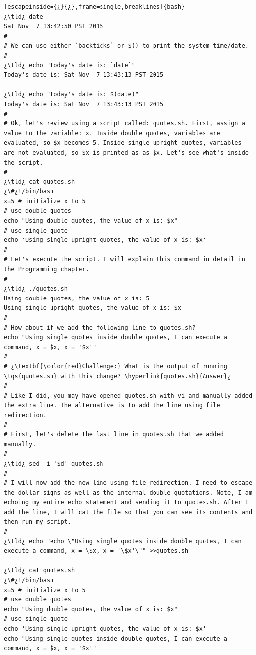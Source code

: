 \begin{lstlisting}[escapeinside={¿}{¿},frame=single,breaklines]{bash}
¿\tld¿ date
Sat Nov  7 13:42:50 PST 2015
#
# We can use either `backticks` or $() to print the system time/date.
#
¿\tld¿ echo "Today's date is: `date`"
Today's date is: Sat Nov  7 13:43:13 PST 2015

¿\tld¿ echo "Today's date is: $(date)"
Today's date is: Sat Nov  7 13:43:13 PST 2015
#
# Ok, let's review using a script called: quotes.sh. First, assign a value to the variable: x. Inside double quotes, variables are evaluated, so $x becomes 5. Inside single upright quotes, variables are not evaluated, so $x is printed as as $x. Let's see what's inside the script.
#
¿\tld¿ cat quotes.sh
¿\#¿!/bin/bash
x=5 # initialize x to 5
# use double quotes
echo "Using double quotes, the value of x is: $x"
# use single quote
echo 'Using single upright quotes, the value of x is: $x'
#
# Let's execute the script. I will explain this command in detail in the Programming chapter.
#
¿\tld¿ ./quotes.sh
Using double quotes, the value of x is: 5
Using single upright quotes, the value of x is: $x
#
# How about if we add the following line to quotes.sh? 
echo "Using single quotes inside double quotes, I can execute a command, x = $x, x = '$x'"
#
# ¿\textbf{\color{red}Challenge:} What is the output of running \tqs{quotes.sh} with this change? \hyperlink{quotes.sh}{Answer}¿ 
#
# Like I did, you may have opened quotes.sh with vi and manually added the extra line. The alternative is to add the line using file redirection. 
#
# First, let's delete the last line in quotes.sh that we added manually.
#
¿\tld¿ sed -i '$d' quotes.sh
#
# I will now add the new line using file redirection. I need to escape the dollar signs as well as the internal double quotations. Note, I am echoing my entire echo statement and sending it to quotes.sh. After I add the line, I will cat the file so that you can see its contents and then run my script.
#
¿\tld¿ echo "echo \"Using single quotes inside double quotes, I can execute a command, x = \$x, x = '\$x'\"" >>quotes.sh

¿\tld¿ cat quotes.sh
¿\#¿!/bin/bash
x=5 # initialize x to 5
# use double quotes
echo "Using double quotes, the value of x is: $x"
# use single quote
echo 'Using single upright quotes, the value of x is: $x'
echo "Using single quotes inside double quotes, I can execute a command, x = $x, x = '$x'"


\end{lstlisting}
